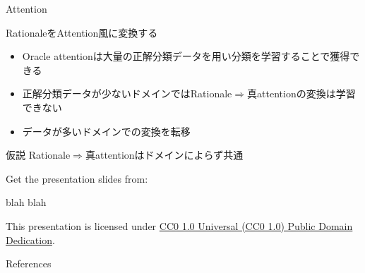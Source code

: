 \begin{frame}{Attention}
\begin{lead}
    RationaleをAttention風に変換する
\end{lead}
\begin{itemize}
\item Oracle attentionは大量の正解分類データを用い分類を学習することで獲得できる
\item 正解分類データが少ないドメインではRationale$\Rightarrow$真attentionの変換は学習できない
\item データが多いドメインでの変換を転移
\end{itemize}
\begin{exampleblock}{仮説}
Rationale$\Rightarrow$真attentionはドメインによらず共通
\end{exampleblock}
\end{frame}


\begin{frame}[c]

  Get the presentation slides from:

  \begin{center}blah blah\end{center}

  This presentation is licensed under
    \href{https://creativecommons.org/publicdomain/zero/1.0/}{
    CC0 1.0 Universal (CC0 1.0) Public Domain Dedication}.

  \begin{center}\cczero\end{center}

\end{frame}

\begin{frame}[allowframebreaks]{References}
  \printbibliography[heading=none]
\end{frame}



